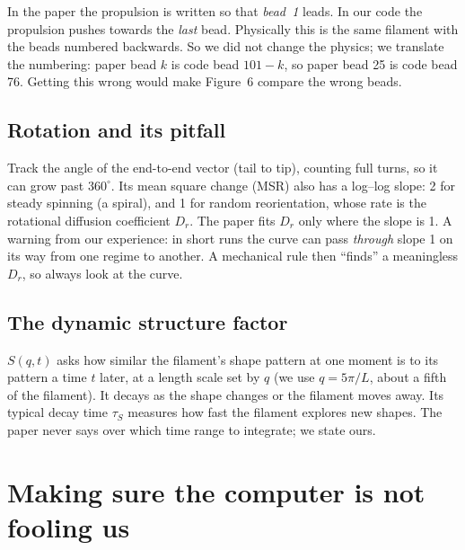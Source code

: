 \documentclass[11pt]{article}
\begin{document}
\begin{keybox}[title=Which end is the head? A subtle bookkeeping point]
In the paper the propulsion is written so that \emph{bead~1} leads. In our code the propulsion pushes towards the \emph{last} bead. Physically this is the same filament
with the beads numbered backwards. So we did not change the physics; we translate the numbering: paper bead $k$ is code bead $101-k$, so paper bead 25 is code bead 76.
Getting this wrong would make Figure~6 compare the wrong beads.
\end{keybox}

\subsection{Rotation and its pitfall}
Track the angle of the end-to-end vector (tail to tip), counting full turns, so it can grow past $360^\circ$. Its mean square change (MSR) also has a log--log slope: 2 for steady spinning (a spiral),
and 1 for random reorientation, whose rate is the rotational diffusion coefficient $D_r$. The paper fits $D_r$ only where the slope is 1. A warning from our experience: in short runs the curve can pass
\emph{through} slope 1 on its way from one regime to another. A mechanical rule then ``finds'' a meaningless $D_r$, so always look at the curve.

\subsection{The dynamic structure factor}
$S(q,t)$ asks how similar the filament's shape pattern at one moment is to its pattern a time $t$ later, at a length scale set by $q$ (we use $q=5\pi/L$, about a fifth of the filament).
It decays as the shape changes or the filament moves away. Its typical decay time $\tau_S$ measures how fast the filament explores new shapes. The paper never says over which time range to integrate; we state ours.

\section{Making sure the computer is not fooling us}
\end{document}

